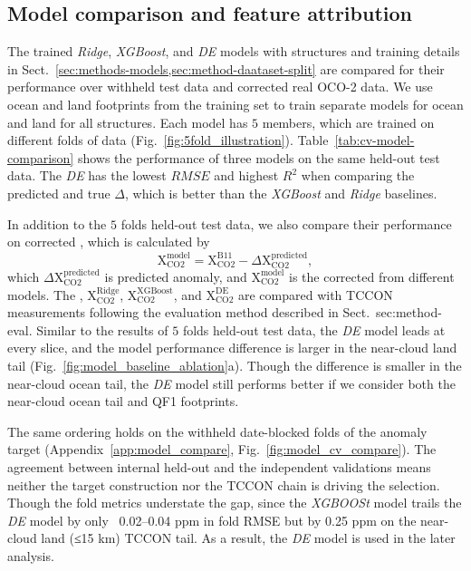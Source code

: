 \subsection{Model comparison and feature attribution}
\label{sec:result-model_comp}


The trained \emph{Ridge}, \emph{XGBoost}, and \emph{DE} models with structures and training details in Sect.~\ref{sec:methods-models,sec:method-daataset-split} are compared for their performance over withheld test data and corrected real OCO-2 data. We use ocean and land footprints from the training set to train separate models for ocean and land for all structures. Each model has $5$ members, which are trained on different folds of data (Fig.~\ref{fig:5fold_illustration}). Table~\ref{tab:cv-model-comparison} shows the performance of three models on the same held-out test data. The \emph{DE} has the lowest $RMSE$ and highest $R^2$ when comparing the predicted and true $\Delta$\xcobc, which is better than the \emph{XGBoost} and \emph{Ridge} baselines.


In addition to the $5$ folds held-out test data, we also compare their performance on corrected \xco, which is calculated by
%
\begin{equation}
  \mathrm{X_{CO2}^{model}} = \mathrm{X_{CO2}^{B11}} - \Delta \mathrm{X_{CO2}^{predicted}},
  \label{eq:xco2_corr}
\end{equation}
%
which $\Delta \mathrm{X_{CO2}^{predicted}}$ is predicted \xco anomaly, and $\mathrm{X_{CO2}^{model}}$ is the corrected \xco from different models. The \xcobc, $\mathrm{X_{CO2}^{Ridge}}$, $\mathrm{X_{CO2}^{XGBoost}}$, and $\mathrm{X_{CO2}^{DE}}$ are compared with TCCON measurements following the evaluation method described in Sect.~{sec:method-eval}. Similar to the results of $5$ folds held-out test data, the \emph{DE} model leads at every slice, and the model performance difference is larger in the near-cloud land tail (Fig.~\ref{fig:model_baseline_ablation}a). Though the difference is smaller in the near-cloud ocean tail, the \emph{DE} model still performs better if we consider both the near-cloud ocean tail and QF1 footprints. 

The same ordering holds on the withheld date-blocked folds of the anomaly target (Appendix~\ref{app:model_compare}, Fig.~\ref{fig:model_cv_compare}). The agreement between internal held-out and the independent validations means neither the target construction nor the TCCON chain is driving the selection. Though the fold metrics understate the gap, since the \emph{XGBOOSt} model trails the \emph{DE} model by only ~0.02–0.04 ppm in fold RMSE but by 0.25 ppm on the near-cloud land (≤15 km) TCCON tail. As a result, the \emph{DE} model is used in the later analysis.



